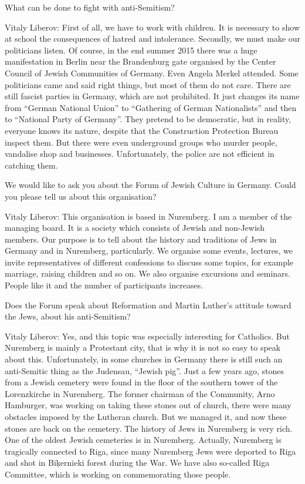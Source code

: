 What can be done to fight with anti-Semitism? 

Vitaly Liberov: First of all, we have to work with children. It is necessary to show at school the consequences of hatred and intolerance. Secondly, we must make our politicians listen. Of course, in the end summer 2015 there was a huge manifestation in Berlin near the Brandenburg gate organised by the Center Council of Jewish Communities of Germany. Even Angela Merkel attended. Some politicians came and said right things, but most of them do not care. There are still fascist parties in Germany, which are not prohibited. It just changes its name from “German National Union” to “Gathering of German Nationalists” and then to “National Party of Germany”. They pretend to be democratic, but in reality, everyone knows its nature, despite that the Construction Protection Bureau inspect them. But there were even underground groups who murder people, vandalise shop and businesses. Unfortunately, the police are not efficient in catching them. 

We would like to ask you about the Forum of Jewish Culture in Germany. Could you please tell us about this organisation?   

Vitaly Liberov: This organisation is based in Nuremberg. I am a member of the managing board. It is a society which consists of Jewish and non-Jewish members. Our purpose is to tell about the history and traditions of Jews in Germany and in Nuremberg, particularly. We organise some events, lectures, we invite representatives of different confessions to discuss some topics, for example marriage, raising children and so on. We also organise excursions and seminars. People like it and the number of participants increases.  

Does the Forum speak about Reformation and Martin Luther’s attitude toward the Jews, about his anti-Semitism? 

Vitaly Liberov: Yes, and this topic was especially interesting for Catholics. But Nuremberg is mainly a Protestant city, that is why it is not so easy to speak about this. Unfortunately, in some churches in Germany there is still such an anti-Semitic thing as the Judensau, “Jewish pig”. Just a few years ago, stones from a Jewish cemetery were found in the floor of the southern tower of the Lorenzkirche in Nuremberg. The former chairman of the Community, Arno Hamburger, was working on taking these stones out of church, there were many obstacles imposed by the Lutheran church. But we managed it, and now these stones are back on the cemetery. The history of Jews in Nuremberg is very rich. One of the oldest Jewish cemeteries is in Nuremberg. Actually, Nuremberg is tragically connected to Riga, since many Nuremberg Jews were deported to Riga and shot in Biķernieki forest during the War. We have also so-called Riga Committee, which is working on commemorating those people.  